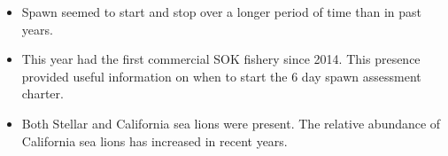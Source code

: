 \begin{itemize}

\item Spawn seemed to start and stop over a longer period of time than in past years.

\item This year had the first commercial SOK fishery since 2014.
This presence provided useful information on when to start the 6 day spawn assessment charter.

\item Both Stellar and California sea lions were present.
The relative abundance of California sea lions has increased in recent years.

\end{itemize}

